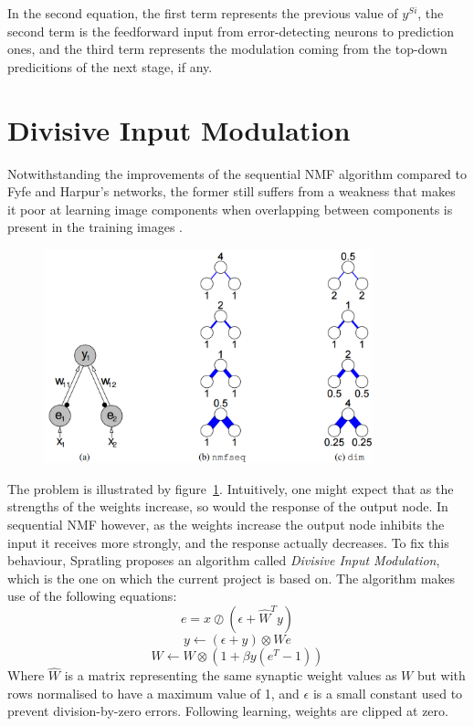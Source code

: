 \documentclass[11pt,a4paper]{report}
\begin{document}
				In the second equation, the first term represents the previous value of $y^{Si}$, the second term is the feedforward input from error-detecting neurons to prediction ones, and
				the third term represents the modulation coming from the top-down predicitions of the next stage, if any.
				
		\section{Divisive Input Modulation}
			Notwithstanding the improvements of the sequential NMF algorithm compared to Fyfe and Harpur's networks, the former still suffers from a weakness that makes it poor at learning image components when overlapping between components is present in the training images \cite{spratling2009unsupervised}.
			
			\begin{figure}[h]
				\centering
				\includegraphics[width=0.85\textwidth]{nmf_problem}
				\caption{\cite{spratling2009unsupervised}}
				\label{fig:nmf_problem}
			\end{figure}	
					
			The problem is illustrated by figure~\ref{fig:nmf_problem}. Intuitively, one might expect that as the strengths of the weights increase, so would the response of the output node. In sequential NMF however, as the weights increase the output node inhibits the input it receives more strongly, and the response actually decreases. To fix this behaviour, Spratling \cite{spratling2009unsupervised} proposes an algorithm called \emph{Divisive Input Modulation}, which is the one on which the current project is based on. The algorithm makes use of the following equations:
			\begin{equation}
				e = x \oslash (\epsilon + \hat{W}^T y)
			\end{equation}
			\begin{equation}
				y \leftarrow (\epsilon + y) \otimes We
			\end{equation}
			\begin{equation}
				W \leftarrow W \otimes (1 + \beta y (e^T - 1))
			\end{equation}
			Where $\hat{W}$ is a matrix representing the same synaptic weight values as $W$ but with rows normalised to have a maximum value of 1, and $\epsilon$ is a small constant used to prevent division-by-zero errors. Following learning, weights are clipped at zero.
			
\end{document}
